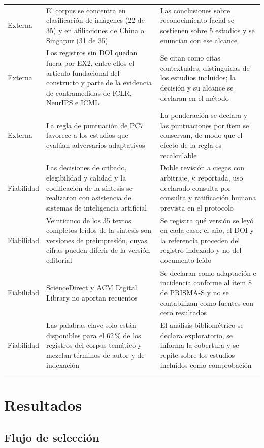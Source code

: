 \documentclass[pdflatex,sn-mathphys-num]{sn-jnl}
\theoremstyle{thmstyleone}
\theoremstyle{thmstyletwo}
\theoremstyle{thmstylethree}
\begin{document}
\begin{table}[h]
\begin{tabularx}{\textwidth}{@{}Y{0.5}Y{1.25}Y{1.25}@{}}
Externa & El corpus se concentra en clasificación de imágenes (22 de 35) y en afiliaciones de China o Singapur (31 de 35) & Las conclusiones sobre reconocimiento facial se sostienen sobre 5 estudios y se enuncian con ese alcance \\
Externa & Los registros sin DOI quedan fuera por EX2, entre ellos el artículo fundacional del constructo y parte de la evidencia de contramedidas de ICLR, NeurIPS e ICML & Se citan como citas contextuales, distinguidas de los estudios incluidos; la decisión y su alcance se declaran en el método \\
Externa & La regla de puntuación de PC7 favorece a los estudios que evalúan adversarios adaptativos & La ponderación se declara y las puntuaciones por ítem se conservan, de modo que el efecto de la regla es recalculable \\
Fiabilidad & Las decisiones de cribado, elegibilidad y calidad y la codificación de la síntesis se realizaron con asistencia de sistemas de inteligencia artificial & Doble revisión a ciegas con arbitraje, $\kappa$ reportada, uso declarado consulta por consulta y ratificación humana prevista en el protocolo \\
Fiabilidad & Veinticinco de los 35 textos completos leídos de la síntesis son versiones de preimpresión, cuyas cifras pueden diferir de la versión editorial & Se registra qué versión se leyó en cada caso; el año, el DOI y la referencia proceden del registro indexado y no del documento leído \\
Fiabilidad & ScienceDirect y ACM Digital Library no aportan recuentos & Se declaran como adaptación e incidencia conforme al ítem 8 de PRISMA-S y no se contabilizan como fuentes con cero resultados \\
Fiabilidad & Las palabras clave solo están disponibles para el 62\,\% de los registros del corpus temático y mezclan términos de autor y de indexación & El análisis bibliométrico se declara exploratorio, se informa la cobertura y se repite sobre los estudios incluidos como comprobación \\
\botrule
\end{tabularx}
\end{table}

\section{Resultados}\label{sec:resultados}

\subsection{Flujo de selección}\label{sec:seleccion}
\end{document}
